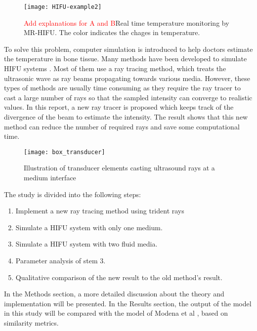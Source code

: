 \begin{figure}[h]
    \centering
    \texttt{[image: HIFU-example2]}
    \caption{\textcolor{red}{Add explanations for A and B}Real time temperature monitoring by MR-HIFU. The color indicates the chages in temperature. \cite{vanwijk2013}}
    \label{fig:HIFU_example}
\end{figure}

To solve this problem, computer simulation is introduced to help doctors estimate the temperature in bone tissue. Many methods have been developed to simulate HIFU systems \cite{StochasticSim}. Most of them use a ray tracing method, which treats the ultrasonic wave as ray beams propagating towards various media. However, these types of methods are usually time consuming as they require the ray tracer to cast a large number of rays so that the sampled intensity can converge to realistic values. In this report, a new ray tracer is proposed which keeps track of the divergence of the beam to estimate the intensity. The result shows that this new method can reduce the number of required rays and save some computational time.

\begin{figure}[h]
    \centering
    \texttt{[image: box\_transducer]}
    \caption{Illustration of transducer elements casting ultrasound rays at a medium interface}
    \label{fig:transducer_coordinates}
\end{figure}

The study is divided into the following steps:

\begin{enumerate}
    \item Implement a new ray tracing method using trident rays
    \item Simulate a HIFU system with only one medium.
    \item Simulate a HIFU system with two fluid media.
    \item Parameter analysis of stem 3.
    \item Qualitative comparison of the new result to the old method's result.
\end{enumerate}

In the Methods section, a more detailed discussion about the theory and implementation will be presented. In the Results section, the output of the model in this study will be compared with the model of Modena et al \cite{Modena_2018}, based on similarity metrics.
